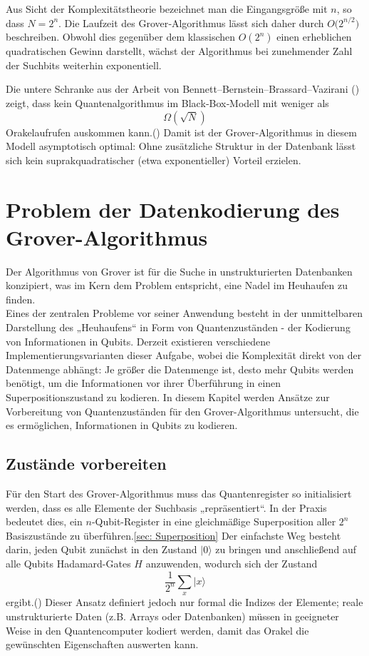 Aus Sicht der Komplexitätstheorie bezeichnet man die Eingangsgröße mit \(n\), so dass $N = 2^n$.
Die Laufzeit des Grover‐Algorithmus lässt sich daher durch  
$O\bigl(2^{n/2}\bigr)$ beschreiben. Obwohl dies gegenüber dem klassischen \(O(2^n)\) einen erheblichen quadratischen Gewinn darstellt, wächst der Algorithmus bei zunehmender Zahl der Suchbits weiterhin exponentiell.

Die untere Schranke aus der Arbeit von Bennett–Bernstein–Brassard–Vazirani (\cite{zotero-1212}) zeigt, dass kein Quantenalgorithmus im Black‐Box‐Modell mit weniger als  
\[
\Omega(\sqrt{N})
\]  
Orakelaufrufen auskommen kann.(\cite{zotero-1211}) Damit ist der Grover‐Algorithmus in diesem Modell asymptotisch optimal: Ohne zusätzliche Struktur in der Datenbank lässt sich kein suprakquadratischer (etwa exponentieller) Vorteil erzielen.  

\section{Problem der Datenkodierung des Grover-Algorithmus}
Der Algorithmus von Grover ist für die Suche in unstrukturierten Datenbanken konzipiert, was im Kern dem Problem entspricht, eine Nadel im Heuhaufen zu finden.\\

Eines der zentralen Probleme vor seiner Anwendung besteht in der unmittelbaren Darstellung des „Heuhaufens“ in Form von Quantenzuständen - der Kodierung von Informationen in Qubits. Derzeit existieren verschiedene Implementierungsvarianten dieser Aufgabe, wobei die Komplexität direkt von der Datenmenge abhängt: Je größer die Datenmenge ist, desto mehr Qubits werden benötigt, um die Informationen vor ihrer Überführung in einen Superpositionszustand zu kodieren. In diesem Kapitel werden Ansätze zur Vorbereitung von Quantenzuständen für den Grover-Algorithmus untersucht, die es ermöglichen, Informationen in Qubits zu kodieren.

\subsection{Zustände vorbereiten}
Für den Start des Grover-Algorithmus muss das Quantenregister so initialisiert werden, dass es alle Elemente der Suchbasis „repräsentiert“. In der Praxis bedeutet dies, ein \(n\)-Qubit-Register in eine gleichmäßige Superposition aller \(2^n\) Basiszustände zu überführen.\ref{sec: Superposition} Der einfachste Weg besteht darin, jeden Qubit zunächst in den Zustand \(\lvert 0\rangle\) zu bringen und anschließend auf alle Qubits Hadamard-Gates \(H\) anzuwenden, wodurch sich der Zustand  
\[
\frac{1}{2^{n}}\sum_{x}\lvert x\rangle
\]
ergibt.(\cite{miguel_a_naranjo_review_2024}) Dieser Ansatz definiert jedoch nur formal die Indizes der Elemente; reale unstrukturierte Daten (z.B. Arrays oder Datenbanken) müssen in geeigneter Weise in den Quantencomputer kodiert werden, damit das Orakel die gewünschten Eigenschaften auswerten kann.

